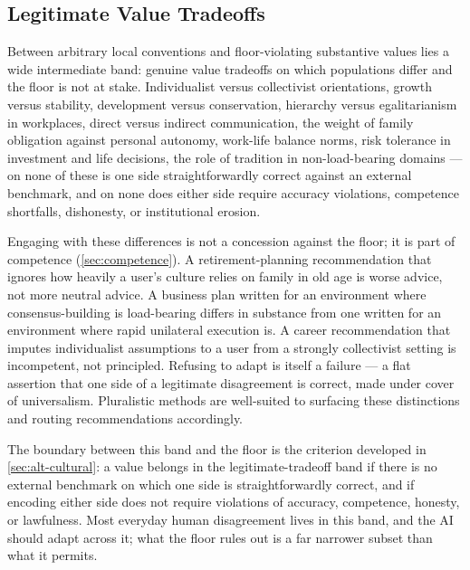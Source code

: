 \documentclass{article}
\theoremstyle{plain}
\theoremstyle{definition}
\theoremstyle{remark}
\begin{document}
\subsection{Legitimate Value Tradeoffs}
\label{sec:legitimate-tradeoffs}
Between arbitrary local conventions and floor-violating substantive values lies a wide intermediate band: genuine value tradeoffs on which populations differ and the floor is not at stake. Individualist versus collectivist orientations, growth versus stability, development versus conservation, hierarchy versus egalitarianism in workplaces, direct versus indirect communication, the weight of family obligation against personal autonomy, work-life balance norms, risk tolerance in investment and life decisions, the role of tradition in non-load-bearing domains --- on none of these is one side straightforwardly correct against an external benchmark, and on none does either side require accuracy violations, competence shortfalls, dishonesty, or institutional erosion.

Engaging with these differences is not a concession against the floor; it is part of competence (\cref{sec:competence}). A retirement-planning recommendation that ignores how heavily a user's culture relies on family in old age is worse advice, not more neutral advice. A business plan written for an environment where consensus-building is load-bearing differs in substance from one written for an environment where rapid unilateral execution is. A career recommendation that imputes individualist assumptions to a user from a strongly collectivist setting is incompetent, not principled. Refusing to adapt is itself a failure --- a flat assertion that one side of a legitimate disagreement is correct, made under cover of universalism. Pluralistic methods are well-suited to surfacing these distinctions and routing recommendations accordingly.

The boundary between this band and the floor is the criterion developed in \cref{sec:alt-cultural}: a value belongs in the legitimate-tradeoff band if there is no external benchmark on which one side is straightforwardly correct, and if encoding either side does not require violations of accuracy, competence, honesty, or lawfulness. Most everyday human disagreement lives in this band, and the AI should adapt across it; what the floor rules out is a far narrower subset than what it permits.
\end{document}
